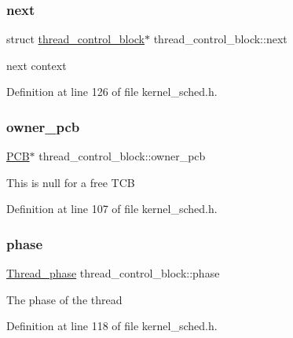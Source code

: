 \subsubsection{\texorpdfstring{next}{next}}
{\footnotesize\ttfamily struct \hyperlink{structthread__control__block}{thread\+\_\+control\+\_\+block}$\ast$ thread\+\_\+control\+\_\+block\+::next}

next context 

Definition at line 126 of file kernel\+\_\+sched.\+h.

\mbox{\label{structthread__control__block_a74aa312623cb8be2bc719d5210b58c04}} 
\subsubsection{\texorpdfstring{owner\+\_\+pcb}{owner\_pcb}}
{\footnotesize\ttfamily \hyperlink{group__proc_gadf327f09ee935cf1734c14e8849f0421}{P\+CB}$\ast$ thread\+\_\+control\+\_\+block\+::owner\+\_\+pcb}

This is null for a free T\+CB 

Definition at line 107 of file kernel\+\_\+sched.\+h.

\mbox{\label{structthread__control__block_aa7e8e6a00c5f9f25210a49589ad818f8}} 
\subsubsection{\texorpdfstring{phase}{phase}}
{\footnotesize\ttfamily \hyperlink{group__scheduler_gab180b4aa356776bddcd724cef4f5deae}{Thread\+\_\+phase} thread\+\_\+control\+\_\+block\+::phase}

The phase of the thread 

Definition at line 118 of file kernel\+\_\+sched.\+h.

\mbox{\label{structthread__control__block_a605a6e9bb8154b658ee72e193599d180}} 
